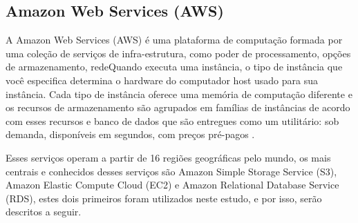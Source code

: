 \subsection{Amazon Web Services (AWS)}

A Amazon Web Services (AWS) é uma plataforma de computação formada por uma coleção de serviços de infra-estrutura, como poder de processamento, opções de armazenamento, redeQuando executa uma instância, o tipo de instância que você especifica determina o hardware do computador host usado para sua instância. Cada tipo de instância oferece uma memória de computação diferente e os recursos de armazenamento são agrupados em famílias de instâncias de acordo com esses recursos e banco de dados que são entregues como um utilitário: sob demanda, disponíveis em segundos, com preços pré-pagos \cite{awsOverview}.

Esses serviços operam a partir de 16 regiões geográficas pelo mundo, os mais centrais e conhecidos desses serviços são Amazon Simple Storage Service (S3), Amazon Elastic Compute Cloud (EC2) e Amazon Relational Database Service (RDS), estes dois primeiros foram utilizados neste estudo, e por isso, serão descritos a seguir.

